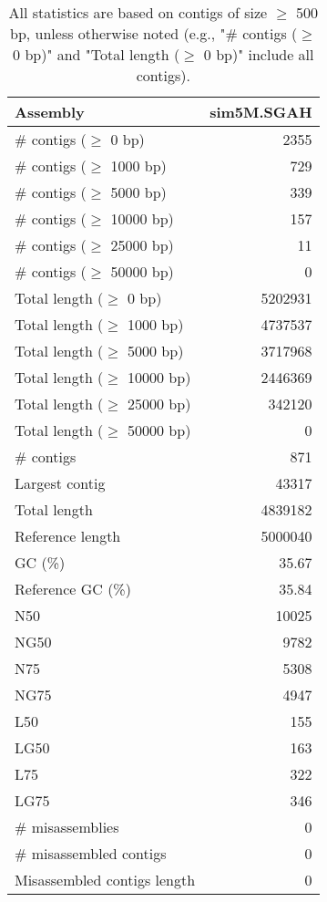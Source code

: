 \documentclass[12pt,a4paper]{article}
\begin{document}
\begin{table}[ht]
\begin{center}
\caption{All statistics are based on contigs of size $\geq$ 500 bp, unless otherwise noted (e.g., "\# contigs ($\geq$ 0 bp)" and "Total length ($\geq$ 0 bp)" include all contigs).}
\begin{tabular}{|l*{1}{|r}|}
\hline
Assembly & sim5M.SGAH \\ \hline
\# contigs ($\geq$ 0 bp) & 2355 \\ \hline
\# contigs ($\geq$ 1000 bp) & 729 \\ \hline
\# contigs ($\geq$ 5000 bp) & 339 \\ \hline
\# contigs ($\geq$ 10000 bp) & 157 \\ \hline
\# contigs ($\geq$ 25000 bp) & 11 \\ \hline
\# contigs ($\geq$ 50000 bp) & 0 \\ \hline
Total length ($\geq$ 0 bp) & 5202931 \\ \hline
Total length ($\geq$ 1000 bp) & 4737537 \\ \hline
Total length ($\geq$ 5000 bp) & 3717968 \\ \hline
Total length ($\geq$ 10000 bp) & 2446369 \\ \hline
Total length ($\geq$ 25000 bp) & 342120 \\ \hline
Total length ($\geq$ 50000 bp) & 0 \\ \hline
\# contigs & 871 \\ \hline
Largest contig & 43317 \\ \hline
Total length & 4839182 \\ \hline
Reference length & 5000040 \\ \hline
GC (\%) & 35.67 \\ \hline
Reference GC (\%) & 35.84 \\ \hline
N50 & 10025 \\ \hline
NG50 & 9782 \\ \hline
N75 & 5308 \\ \hline
NG75 & 4947 \\ \hline
L50 & 155 \\ \hline
LG50 & 163 \\ \hline
L75 & 322 \\ \hline
LG75 & 346 \\ \hline
\# misassemblies & 0 \\ \hline
\# misassembled contigs & 0 \\ \hline
Misassembled contigs length & 0 \\ \hline

\end{tabular}
\end{center}
\end{table}
\end{document}
